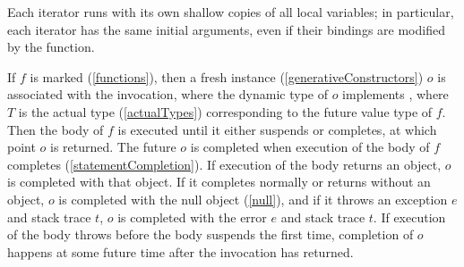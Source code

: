 \documentclass[makeidx]{article}
\begin{document}
{

\LMHash{}%
Each iterator runs with its own shallow copies of all local variables;
in particular, each iterator has the same initial arguments,
even if their bindings are modified by the function.

\LMHash{}%
If $f$ is marked \ASYNC{} (\ref{functions}),
then a fresh instance (\ref{generativeConstructors}) $o$
is associated with the invocation,
where the dynamic type of $o$ implements ,
where $T$ is the actual type
(\ref{actualTypes})
corresponding to the future value type of $f$.
Then the body of $f$ is executed until it either suspends or completes,
at which point $o$ is returned.
The future $o$ is completed when execution of the body of $f$ completes
(\ref{statementCompletion}).
If execution of the body returns an object, $o$ is completed with that object.
If it completes normally or returns without an object,
$o$ is completed with the null object (\ref{null}),
and if it throws an exception $e$ and stack trace $t$,
$o$ is completed with the error $e$ and stack trace $t$.
If execution of the body throws before the body suspends the first time,
completion of $o$ happens at some future time after the invocation has returned.

}
\end{document}

